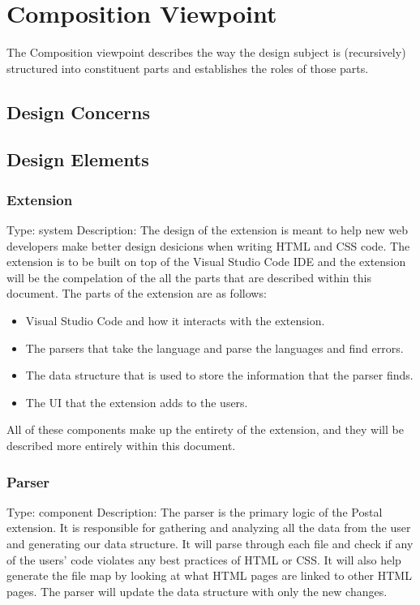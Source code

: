 \documentclass[letterpaper,10pt,titlepage,draftclsnofoot,onecolumn,onesided] {IEEEtran}
\begin{document}


\section{Composition Viewpoint}
The Composition viewpoint describes the way the design subject is (recursively) structured into constituent
parts and establishes the roles of those parts. 
\subsection{Design Concerns}
\subsection{Design Elements}

	\subsubsection{Extension}
	Type: system
	Description: The design of the extension is meant to help new web developers make better design desicions when writing HTML and CSS code.
	The extension is to be built on top of the Visual Studio Code IDE and the extension will be the compelation of the all the parts that are described within this document. 
	The parts of the extension are as follows:
	\begin{itemize}
	\item Visual Studio Code and how it interacts with the extension.
	\item The parsers that take the language and parse the languages and find errors.
	\item The data structure that is used to store the information that the parser finds.
	\item The UI that the extension adds to the users. 
	\end{itemize}
	All of these components make up the entirety of the extension, and they will be described more entirely within this document. 
	
	\subsubsection{Parser}
	Type: component
	Description: The parser is the primary logic of the Postal extension. 
	It is responsible for gathering and analyzing all the data from the user and generating our data structure.
	It will parse through each file and check if any of the users' code violates any best practices of HTML or CSS. 
	It will also help generate the file map by looking at what HTML pages are linked to other HTML pages.
	The parser will update the data structure with only the new changes.
	
\end{document}
